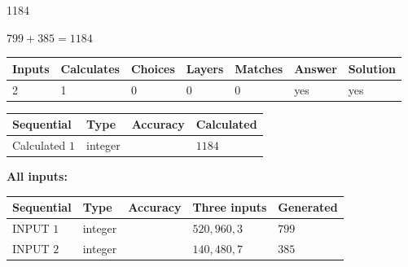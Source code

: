 \documentclass{ctexart}
\begin{document}
 
 
\noindent{}
 
 

1184
 
 
\noindent{}
 
 

 
 
 
\noindent{}
 
 

$ %
799 +  %
385=   %
1184$
 
 
\noindent{}
 
 

 
   
   
   
   
\noindent\begin{tabular}{|l|l|l|l|l|l|l|}
 \hline
Inputs & Calculates & Choices & Layers & Matches & Answer & Solution \\ \hline
 2  & 
 1  & 
 0
  & 
 0  & 
 0  & 
  yes & 
  yes 
  \\ \hline
 \end{tabular}
   
   
   
   
\noindent{}
   
   
  
  
\noindent\begin{tabular}{|l|l|l|l|}
\hline
 Sequential & Type & Accuracy & Calculated \\ 
\hline
 
 
  Calculated $  1 $ & integer &  & 
  $ 1184 $ 
 \\  \hline  
 \end{tabular}
   
   
   
   
\noindent\vspace{0.1in}\hspace{-0.08in} {\textbf{\Large{All inputs: }}}
   
   
  
  
\noindent\begin{tabular}{|l|l|l|l|l|}
\hline
 Sequential & Type & Accuracy & Three inputs & Generated \\ 
\hline
 
 
  INPUT $  1 $ & integer &  & $
 520
 , 
 960
 , 
 3
 $ & $ 799 $ 
 \\  \hline  
 
 
  INPUT $  2 $ & integer &  & $
 140
 , 
 480
 , 
 7
 $ & $ 385 $ 
 \\  \hline  
 \end{tabular}
   
\end{document}

